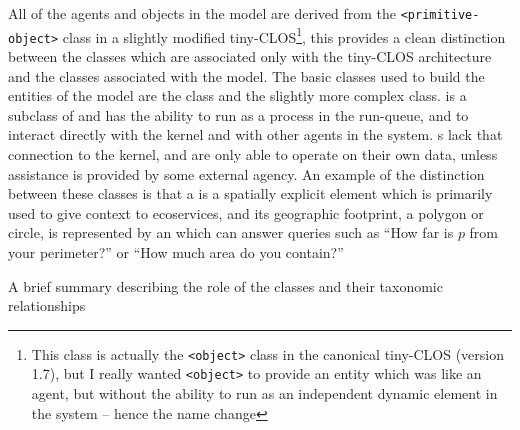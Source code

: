 All of the agents and objects in the model are derived
from the \texttt{<primitive-object>} class in a slightly modified
tiny-CLOS\footnote{This class is actually the \texttt{<object>} class in
  the canonical tiny-CLOS (version 1.7), but I really wanted
  \texttt{<object>} to provide an entity which was like an agent, but
  without the ability to run as an independent dynamic element in the
  system -- hence the name change}, this provides a clean distinction
between the classes which are associated only with the tiny-CLOS
architecture and the classes associated with the model.  The basic
classes used to build the entities of the model are the
 class and the slightly more complex 
class.  is a subclass of  and has the ability to
run as a process in the run-queue, and to interact directly with the
kernel and with other agents in the system.  s lack that
connection to the kernel, and are only able to operate on their own
data, unless assistance is provided by some external agency.  An
example of the distinction between these classes is that a 
is a spatially explicit  element which is primarily used to
give context to ecoservices, and its geographic footprint, a polygon
or circle, is represented by an  which can answer queries
such as ``How far is $p$ from your perimeter?'' or ``How much area do
you contain?'' 

A brief summary describing the role of the classes and their taxonomic
relationships 

